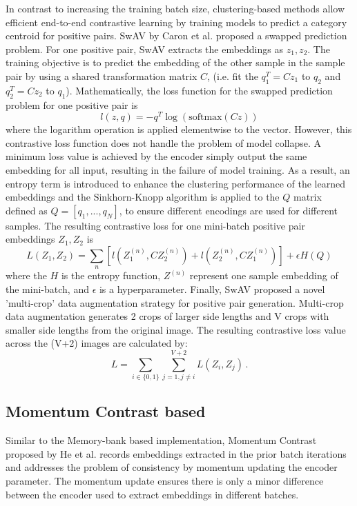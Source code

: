 \documentclass[12pt,twoside]{report}
\begin{document}
In contrast to increasing the training batch size, clustering-based methods allow efficient end-to-end contrastive learning by training models to predict a category centroid for positive pairs. SwAV by Caron et al.\cite{swav} proposed a swapped prediction problem. For one positive pair, SwAV extracts the embeddings as $z_1, z_2$. The training objective is to predict the embedding of the other sample in the sample pair by using a shared transformation matrix $C$, (i.e. fit the $q_1^T = C z_1$ to $q_2$ and $q_2^T = C z_2$ to $q_1$). Mathematically, the loss function for the swapped prediction problem for one positive pair is $$l(z, q) = - q^T \log(\text{softmax}(C z))$$where the logarithm operation is applied elementwise to the vector. However, this contrastive loss function does not handle the problem of model collapse. A minimum loss value is achieved by the encoder simply output the same embedding for all input, resulting in the failure of model training. As a result, an entropy term is introduced to enhance the clustering performance of the learned embeddings and the Sinkhorn-Knopp algorithm is applied to the $Q$ matrix defined as $Q = [q_1, ..., q_N]$, to ensure different encodings are used for different samples. The resulting contrastive loss for one mini-batch positive pair embeddings $Z_1, Z_2$ is $$L(Z_1, Z_2) = \sum_{n}[l(Z_1^{(n)}, C Z_2^{(n)}) + l(Z_2^{(n)}, C Z_1^{(n)})] + \epsilon H(Q)$$where the $H$ is the entropy function, $Z^{(n)}$ represent one sample embedding of the mini-batch, and $\epsilon$ is a hyperparameter. Finally, SwAV proposed a novel 'multi-crop' data augmentation strategy for positive pair generation. Multi-crop data augmentation generates 2 crops of larger side lengths and V crops with smaller side lengths from the original image. The resulting contrastive loss value across the (V+2) images are calculated by: $$L = \sum_{i \in \{0, 1\}} \sum_{j = 1, j \neq i}^{V+2} L(Z_i, Z_j)\,.$$

\subsection{Momentum Contrast based} \label{MOCO_relatedwork}
Similar to the Memory-bank based implementation, Momentum Contrast proposed by He et al.\cite{moco} records embeddings extracted in the prior batch iterations and addresses the problem of consistency by momentum updating the encoder parameter. The momentum update ensures there is only a minor difference between the encoder used to extract embeddings in different batches.\\
\end{document}
